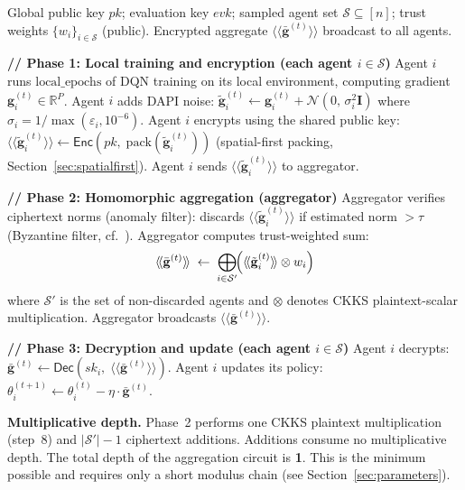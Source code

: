 \documentclass[letterpaper,journal]{IEEEtran}
\newcommand{\ct}[1]{\langle\!\langle #1 \rangle\!\rangle}
\newcommand{\Enc}{\mathsf{Enc}}
\newcommand{\Dec}{\mathsf{Dec}}
\newcommand{\RR}{\mathbb{R}}
\newcommand{\eps}{\varepsilon}
\begin{document}
\begin{algorithm}
\caption{CipherFRL Aggregation (one round $t$)}
\label{alg:agg}
\begin{algorithmic}[1]
\REQUIRE
  Global public key $pk$; evaluation key $evk$;
  sampled agent set $\mathcal{S} \subseteq [n]$;
  trust weights $\{w_i\}_{i \in \mathcal{S}}$ (public).
\ENSURE
  Encrypted aggregate $\ct{\bar{\mathbf{g}}^{(t)}}$ broadcast to all agents.

\STATE \textbf{// Phase 1: Local training and encryption (each agent $i \in \mathcal{S}$)}
\STATE Agent $i$ runs $\text{local\_epochs}$ of DQN training on its local
       environment, computing gradient $\mathbf{g}_i^{(t)} \in \RR^P$.
\STATE Agent $i$ adds DAPI noise:
       $\tilde{\mathbf{g}}_i^{(t)} \leftarrow \mathbf{g}_i^{(t)} +
       \mathcal{N}(0,\, \sigma_i^2 \mathbf{I})$
       where $\sigma_i = 1/\max(\eps_i, 10^{-6})$.
\STATE Agent $i$ encrypts using the shared public key:
       $\ct{\tilde{\mathbf{g}}_i^{(t)}} \leftarrow
       \Enc(pk,\; \text{pack}(\tilde{\mathbf{g}}_i^{(t)}))$
       (spatial-first packing, Section~\ref{sec:spatialfirst}).
\STATE Agent $i$ sends $\ct{\tilde{\mathbf{g}}_i^{(t)}}$ to aggregator.

\STATE \textbf{// Phase 2: Homomorphic aggregation (aggregator)}
\STATE Aggregator verifies ciphertext norms (anomaly filter):
       discards $\ct{\tilde{\mathbf{g}}_i^{(t)}}$ if estimated norm
       $> \tau$ (Byzantine filter, cf.~\cite{frlconf2026}).
\STATE Aggregator computes trust-weighted sum:
\[
  \ct{\bar{\mathbf{g}}^{(t)}}
  \;\leftarrow\;
  \bigoplus_{i \in \mathcal{S}'}\!
  \Bigl(\ct{\tilde{\mathbf{g}}_i^{(t)}} \otimes w_i\Bigr)
\]
where $\mathcal{S}'$ is the set of non-discarded agents and
$\otimes$ denotes CKKS plaintext-scalar multiplication.
\STATE Aggregator broadcasts $\ct{\bar{\mathbf{g}}^{(t)}}$.

\STATE \textbf{// Phase 3: Decryption and update (each agent $i \in \mathcal{S}$)}
\STATE Agent $i$ decrypts:
       $\bar{\mathbf{g}}^{(t)} \leftarrow
       \Dec(sk_i,\; \ct{\bar{\mathbf{g}}^{(t)}})$.
\STATE Agent $i$ updates its policy:
       $\theta_i^{(t+1)} \leftarrow \theta_i^{(t)} - \eta \cdot \bar{\mathbf{g}}^{(t)}$.
\end{algorithmic}
\end{algorithm}

\textbf{Multiplicative depth.}
Phase~2 performs one CKKS plaintext multiplication (step~8) and $|\mathcal{S}'|-1$
ciphertext additions.
Additions consume no multiplicative depth.
The total depth of the aggregation circuit is \textbf{1}.
This is the minimum possible and requires only a short modulus chain
(see Section~\ref{sec:parameters}).
\end{document}
